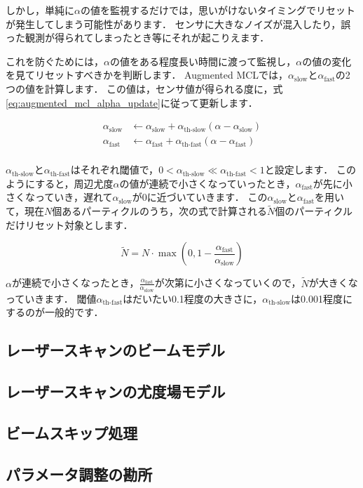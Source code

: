 \documentclass[{../../master}]{subfiles}
\begin{document}
しかし，単純に$\alpha$の値を監視するだけでは，思いがけないタイミングでリセットが発生してしまう可能性があります．
センサに大きなノイズが混入したり，誤った観測が得られてしまったとき等にそれが起こりえます．

これを防ぐためには，$\alpha$の値をある程度長い時間に渡って監視し，$\alpha$の値の変化を見てリセットすべきかを判断します．
Augmented MCLでは，$\alpha_{\text{slow}}$と$\alpha_{\text{fast}}$の2つの値を計算します．
この値は，センサ値が得られる度に，式\ref{eq:augmented_mcl_alpha_update}に従って更新します．

\begin{equation}
  \begin{split}
    \alpha_{\text{slow}} &\leftarrow \alpha_{\text{slow}} + \alpha_{\text{th-slow}}(\alpha - \alpha_{\text{slow}}) \\
    \alpha_{\text{fast}} &\leftarrow \alpha_{\text{fast}} + \alpha_{\text{th-fast}}(\alpha - \alpha_{\text{fast}}) \\
  \end{split}
  \label{eq:augmented_mcl_alpha_update}
\end{equation}

$\alpha_{\text{th-slow}}$と$\alpha_{\text{th-fast}}$はそれぞれ閾値で，$0 < \alpha_{\text{th-slow}} \ll \alpha_{\text{th-fast}} < 1$と設定します．
このようにすると，周辺尤度$\alpha$の値が連続で小さくなっていったとき，$\alpha_{\text{fast}}$が先に小さくなっていき，遅れて$\alpha_{\text{slow}}$が0に近づいていきます．
この$\alpha_{\text{slow}}$と$\alpha_{\text{fast}}$を用いて，現在$N$個あるパーティクルのうち，次の式で計算される$\tilde{N}$個のパーティクルだけリセット対象とします．

\begin{equation}
  \tilde{N} = N \cdot \max \left(0, 1 - \frac{\alpha_{\text{fast}}}{\alpha_{\text{slow}}}\right)
\end{equation}

$\alpha$が連続で小さくなったとき，$\frac{\alpha_{\text{fast}}}{\alpha_{\text{slow}}}$が次第に小さくなっていくので，$\tilde{N}$が大きくなっていきます．
閾値$\alpha_{\text{th-fast}}$はだいたい0.1程度の大きさに，$\alpha_{\text{th-slow}}$は0.001程度にするのが一般的です．

\subsection{レーザースキャンのビームモデル}

\subsection{レーザースキャンの尤度場モデル}

\subsection{ビームスキップ処理}

\subsection{パラメータ調整の勘所}
\end{document}
